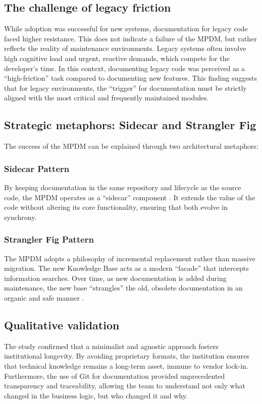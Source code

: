 \documentclass{ieeeaccess}
\begin{document}
\subsection{The challenge of legacy friction}
While adoption was successful for new systems, documentation for legacy code faced higher resistance. This does not indicate a failure of the MPDM, but rather reflects the reality of maintenance environments. Legacy systems often involve high cognitive load and urgent, reactive demands, which compete for the developer's time. In this context, documenting legacy code was perceived as a ``high-friction'' task compared to documenting new features. This finding suggests that for legacy environments, the ``trigger'' for documentation must be strictly aligned with the most critical and frequently maintained modules.

\subsection{Strategic metaphors: Sidecar and Strangler Fig}
The success of the MPDM can be explained through two architectural metaphors:

\subsubsection{Sidecar Pattern}
By keeping documentation in the same repository and lifecycle as the source code, the MPDM operates as a ``sidecar'' component \cite{microsoft}. It extends the value of the code without altering its core functionality, ensuring that both evolve in synchrony.

\subsubsection{Strangler Fig Pattern}
The MPDM adopts a philosophy of incremental replacement rather than massive migration. The new Knowledge Base acts as a modern ``facade'' that intercepts information searches. Over time, as new documentation is added during maintenance, the new base ``strangles'' the old, obsolete documentation in an organic and safe manner \cite{fowler}.
\subsection{Qualitative validation}
The study confirmed that a minimalist and agnostic approach fosters institutional longevity. By avoiding proprietary formats, the institution ensures that technical knowledge remains a long-term asset, immune to vendor lock-in. Furthermore, the use of Git for documentation provided unprecedented transparency and traceability, allowing the team to understand not only what changed in the business logic, but who changed it and why.
\end{document}
